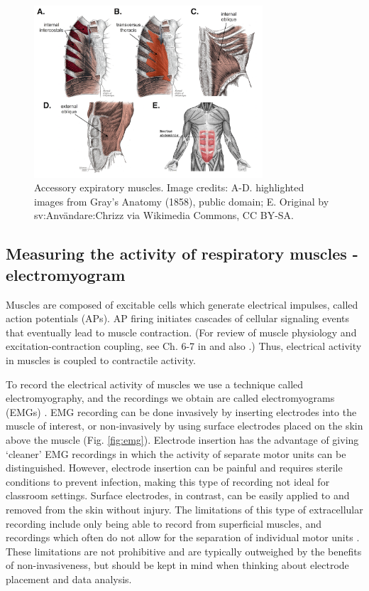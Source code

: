 \documentclass[12pt]{article}
\begin{document}
\begin{figure}[h!]
\centering
\includegraphics[width=0.76\textwidth]{images/accessory_exp.png}
\caption{Accessory expiratory muscles. Image credits: A-D. highlighted images from Gray's Anatomy (1858), public domain; E. Original by sv:Anv\"andare:Chrizz via Wikimedia Commons, CC BY-SA.}
\label{fig:acc_exp}
\end{figure}

\subsection*{Measuring the activity of respiratory muscles - electromyogram}

Muscles are composed of excitable cells which generate electrical impulses, called action potentials (APs). AP firing initiates cascades of cellular signaling events that eventually lead to muscle contraction. (For review of muscle physiology and excitation-contraction coupling, see Ch. 6-7 in \cite{guyton20006textbook} and also \cite{sieck2013mechanical}.) Thus, electrical activity in muscles is coupled to contractile activity. 

To record the electrical activity of muscles we use a technique called electromyography, and the recordings we obtain are called electromyograms (EMGs) \cite{garcia2011surface}. EMG recording can be done invasively by inserting electrodes into the muscle of interest, or non-invasively by using surface electrodes placed on the skin above the muscle (Fig. \ref{fig:emg}). Electrode insertion has the advantage of giving `cleaner' EMG recordings in which the activity of separate motor units can be distinguished. However, electrode insertion can be painful and requires sterile conditions to prevent infection, making this type of recording not ideal for classroom settings. Surface electrodes, in contrast, can be easily applied to and removed from the skin without injury. The limitations of this type of extracellular recording include only being able to record from superficial muscles, and recordings which often do not allow for the separation of individual motor units \cite{garcia2011surface}. These limitations are not prohibitive and are typically outweighed by the benefits of non-invasiveness, but should be kept in mind when thinking about electrode placement and data analysis. 
\end{document}
